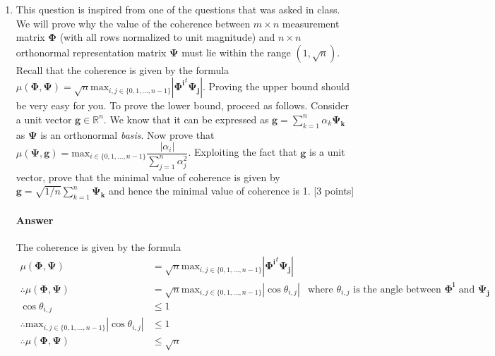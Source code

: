 \documentclass[11pt]{article}
\begin{document}
\maketitle

\begin{enumerate}
\item This question is inspired from one of the questions that was asked in class. We will prove why the value of the coherence between $m \times n$ measurement matrix $\mathbf{\Phi}$ (with all rows normalized to unit magnitude) and $n \times n$ orthonormal representation matrix $\mathbf{\Psi}$ must lie within the range $(1,\sqrt{n})$. Recall that the coherence is given by the formula
$\mu(\mathbf{\Phi},\mathbf{\Psi}) = \sqrt{n} \textrm{max}_{i,j \in \{0,1,...,n-1\}} |\mathbf{\Phi^i}^t \mathbf{\Psi_j}|$. 
Proving the upper bound should be very easy for you. To prove the lower bound, proceed as follows. Consider a unit vector $\mathbf{g} \in \mathbb{R}^n$. We know that it can be expressed as $\mathbf{g} = \sum_{k=1}^n \alpha_k \mathbf{\Psi_k}$ as $\mathbf{\Psi}$ is an orthonormal \emph{basis}. Now prove that $\mu(\mathbf{\Psi},\mathbf{g}) = \textrm{max}_{i \in \{0,1,...,n-1\}} \dfrac{|\alpha_i|}{\sum_{j=1}^n \alpha^2_j}$. Exploiting the fact that $\mathbf{g}$ is a unit vector, prove that the minimal value of coherence is given by $\mathbf{g} = \sqrt{1/n} \sum_{k=1}^n \mathbf{\Psi_k}$ and hence the minimal value of coherence is 1. \textsf{[3 points]}

\paragraph{Answer} The coherence is given by the formula \\
\begin{align}
\mu(\mathbf{\Phi},\mathbf{\Psi}) &= \sqrt{n} \textrm{max}_{i,j \in \{0,1,...,n-1\}} |\mathbf{\Phi^i}^t \mathbf{\Psi_j}| & \\
\therefore \mu(\mathbf{\Phi},\mathbf{\Psi}) &= \sqrt{n} \textrm{max}_{i,j \in \{0,1,...,n-1\}} |\cos{\theta}_{i, j}| &\textrm{where $\theta_{i, j}$ is the angle between $\mathbf{\Phi^i}$ and $\mathbf{\Psi_j}$} \\
\cos{\theta}_{i, j} &\le 1 & \\
\therefore \textrm{max}_{i,j \in \{0,1,...,n-1\}} |\cos{\theta}_{i, j}| &\le 1 &\\
\therefore \mu(\mathbf{\Phi},\mathbf{\Psi}) &\le \sqrt{n}
\end{align}


\end{enumerate}
\end{document}
